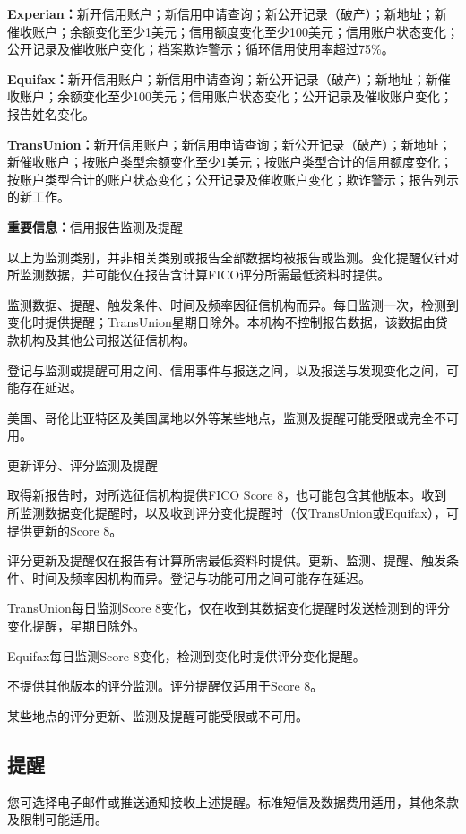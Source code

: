 \documentclass[UTF8,fontset=none,11pt,a4paper]{ctexart}
\begin{document}
\textbf{Experian：}新开信用账户；新信用申请查询；新公开记录（破产）；新地址；新催收账户；余额变化至少1美元；信用额度变化至少100美元；信用账户状态变化；公开记录及催收账户变化；档案欺诈警示；循环信用使用率超过75\%。


\textbf{Equifax：}新开信用账户；新信用申请查询；新公开记录（破产）；新地址；新催收账户；余额变化至少100美元；信用账户状态变化；公开记录及催收账户变化；报告\allowbreak\mbox{姓名变化。}


\textbf{TransUnion：}新开信用账户；新信用申请查询；新公开记录（破产）；新地址；新催收账户；按账户类型余额变化至少1美元；按账户类型合计的信用额度变化；按账户类型合计的账户状态变化；公开记录及催收账户变化；欺诈警示；报告列示\allowbreak\mbox{的新工作。}


\textbf{重要信息：}信用报告监\allowbreak\mbox{测及提醒}


以上为监测类别，并非相关类别或报告全部数据均被报告或监测。变化提醒仅针对所监测数据，并可能仅在报告含计算FICO评分所需最低资\allowbreak\mbox{料时提供。}


监测数据、提醒、触发条件、时间及频率因征信机构而异。每日监测一次，检测到变化时提供提醒；TransUnion星期日除外。本机构不控制报告数据，该数据由贷款机构及其他公司报送\allowbreak\mbox{征信机构。}


登记与监测或提醒可用之间、信用事件与报送之间，以及报送与发现变化之间，可能\allowbreak\mbox{存在延迟。}


美国、哥伦比亚特区及美国属地以外等某些地点，监测及提醒可能受限或完\allowbreak\mbox{全不可用。}


更新评分、评分监\allowbreak\mbox{测及提醒}


取得新报告时，对所选征信机构提供FICO Score 8，也可能包含其他版本。收到所监测数据变化提醒时，以及收到评分变化提醒时（仅TransUnion或Equifax），可提供更新的Score 8。


评分更新及提醒仅在报告有计算所需最低资料时提供。更新、监测、提醒、触发条件、时间及频率因机构而异。登记与功能可用之间可能\allowbreak\mbox{存在延迟。}


TransUnion每日监测Score 8变化，仅在收到其数据变化提醒时发送检测到的评分变化提醒，星\allowbreak\mbox{期日除外。}


Equifax每日监测Score 8变化，检测到变化时提供评分\allowbreak\mbox{变化提醒。}


不提供其他版本的评分监测。评分提醒仅适用于Score 8。


某些地点的评分更新、监测及提醒可能受限\allowbreak\mbox{或不可用。}


\subsection*{提醒}
您可选择电子邮件或推送通知接收上述提醒。标准短信及数据费用适用，其他条款及限制\allowbreak\mbox{可能适用。}
\end{document}
